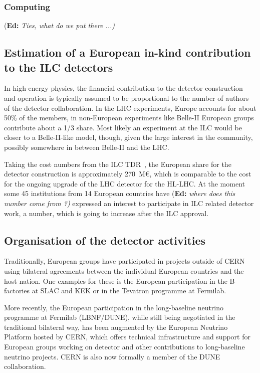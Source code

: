 \documentclass[%
 reprint,
 amsmath,amssymb,
 aps,
]{revtex4-1}
\newif\ifEdNotes \EdNotestrue
\newcommand{\doednote}[1]{{\color{red}(\textbf{Ed:} \textit{#1)}}}
\newcommand{\ednote}[1]{\ifEdNotes 
  \doednote{#1} 
\fi}
\begin{document}
\subsubsection{Computing}
\ednote{Ties, what do we put there ...}

\subsection{\label{sec:det:constructionmodel} Estimation of a
European in-kind contribution to the ILC detectors}

In high-energy physics, the financial contribution to the detector
construction and operation is typically assumed to be proportional to the number of authors of
the detector collaboration. In the LHC experiments, Europe accounts for about 50\% of the members, 
in non-European experiments like Belle-II European groups contribute about a 1/3 share. Most likely 
an experiment at the ILC would be closer to a Belle-II-like model, though, given the large interest 
in the community, possibly somewhere in between Belle-II and the LHC. 

Taking the cost numbers from the ILC TDR~\cite{Behnke:2013lya}, the European share for the detector construction 
is approximately 270~M\euro{}, which is comparable to the cost for the ongoing upgrade of the LHC detector for the HL-LHC. 
At the moment some 45 institutions from 14 European countries have \ednote{ where does this number come from ?} expressed 
an interest to participate in ILC related detector work, a number, which is going to increase after the ILC approval.

\subsection{\label{sec:det:Organisation} Organisation of the detector activities}
Traditionally, European groups have participated in projects outside of CERN using bilateral agreements between the individual 
European countries and the host nation. One examples for these is the European 
participation in the B-factories at SLAC and KEK or in the Tevatron programme at 
Fermilab.

More recently, the European participation in the long-baseline neutrino 
programme at Fermilab (LBNF/DUNE), while still being negotiated in the 
traditional bilateral way, has been augmented by the European Neutrino Platform 
hosted by CERN, which offers technical infrastructure and support for European 
groups working on detector and other contributions to long-baseline neutrino 
projects. CERN is also now formally a member of the DUNE collaboration.
\end{document}
